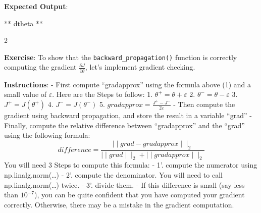 \documentclass[11pt]{article}
\begin{document}
    \textbf{Expected Output}:

** dtheta **

2

    \textbf{Exercise}: To show that the \texttt{backward\_propagation()}
function is correctly computing the gradient
$\frac{\partial J}{\partial \theta}$, let's implement gradient checking.

\textbf{Instructions}: - First compute ``gradapprox'' using the formula
above (1) and a small value of $\varepsilon$. Here are the Steps to
follow: 1. $\theta^{+} = \theta + \varepsilon$ 2.
$\theta^{-} = \theta - \varepsilon$ 3. $J^{+} = J(\theta^{+})$ 4.
$J^{-} = J(\theta^{-})$ 5.
$gradapprox = \frac{J^{+} - J^{-}}{2  \varepsilon}$ - Then compute the
gradient using backward propagation, and store the result in a variable
``grad'' - Finally, compute the relative difference between
``gradapprox'' and the ``grad'' using the following formula:
\[ difference = \frac {\mid\mid grad - gradapprox \mid\mid_2}{\mid\mid grad \mid\mid_2 + \mid\mid gradapprox \mid\mid_2} \tag{2}\]
You will need 3 Steps to compute this formula: - 1'. compute the
numerator using np.linalg.norm(\ldots{}) - 2'. compute the denominator.
You will need to call np.linalg.norm(\ldots{}) twice. - 3'. divide them.
- If this difference is small (say less than $10^{-7}$), you can be
quite confident that you have computed your gradient correctly.
Otherwise, there may be a mistake in the gradient computation.
\end{document}
